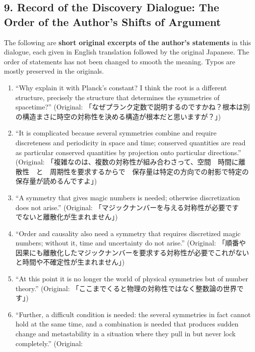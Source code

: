 \documentclass[
  a4paper,
]{article}
\providecommand{\tightlist}{%
  \setlength{\itemsep}{0pt}\setlength{\parskip}{0pt}}
\begin{document}
\subsection{9. Record of the Discovery Dialogue: The Order of the
Author's Shifts of
Argument}\label{record-of-the-discovery-dialogue-the-order-of-the-authors-shifts-of-argument}

The following are \textbf{short original excerpts of the author's
statements} in this dialogue, each given in English translation followed
by the original Japanese. The order of statements has not been changed
to smooth the meaning. Typos are mostly preserved in the originals.

\begin{enumerate}
\def\labelenumi{\arabic{enumi}.}
\tightlist
\item
  ``Why explain it with Planck's constant? I think the root is a
  different structure, precisely the structure that determines the
  symmetries of spacetime?'' (Original:
  「なぜプランク定数で説明するのですかね？根本は別の構造まさに時空の対称性を決める構造が根本だと思いますが？」)
\item
  ``It is complicated because several symmetries combine and require
  discreteness and periodicity in space and time; conserved quantities
  are read as particular conserved quantities by projection onto
  particular directions.'' (Original:
  「複雑なのは、複数の対称性が組み合わさって、空間　時間に離散性　と　周期性を要求するからで　保存量は特定の方向での射影で特定の保存量が読めるんですよ」)
\item
  ``A symmetry that gives magic numbers is needed; otherwise
  discretization does not arise.'' (Original:
  「マジックナンバーを与える対称性が必要です　でないと離散化が生まれません」)
\item
  ``Order and causality also need a symmetry that requires discretized
  magic numbers; without it, time and uncertainty do not arise.''
  (Original:
  「順番や因果にも離散化したマジックナンバーを要求する対称性が必要でこれがないと時間や不確定性が生まれません」)
\item
  ``At this point it is no longer the world of physical symmetries but
  of number theory.'' (Original:
  「ここまでくると物理の対称性ではなく整数論の世界です」)
\item
  ``Further, a difficult condition is needed: the several symmetries in
  fact cannot hold at the same time, and a combination is needed that
  produces sudden change and metastability in a situation where they
  pull in but never lock completely.'' (Original:

\end{enumerate}
\end{document}
